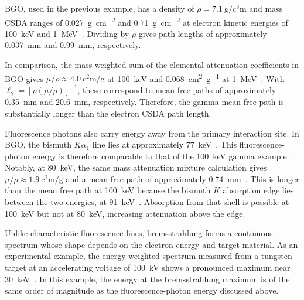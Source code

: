 BGO, used in the previous example, has a density of $\rho=\qty{7.1}{\gram\per\cubic\centi\metre}$ and mass CSDA ranges of \qty{0.027}{\gram\per\square\centi\metre} and \qty{0.71}{\gram\per\square\centi\metre} at electron kinetic energies of \qty{100}{\kilo\electronvolt} and \qty{1}{\mega\electronvolt}~\parencite{nistestar}. Dividing by $\rho$ gives path lengths of approximately \qty{0.037}{\milli\metre} and \qty{0.99}{\milli\metre}, respectively.

In comparison, the mass-weighted sum of the elemental attenuation coefficients in BGO gives $\mu/\rho\approx\qty{4.0}{\square\centi\metre\per\gram}$ at \qty{100}{\kilo\electronvolt} and \qty{0.068}{\square\centi\metre\per\gram} at \qty{1}{\mega\electronvolt}~\parencite{nistxcom}. With $\ell_\gamma=[\rho(\mu/\rho)]^{-1}$, these correspond to mean free paths of approximately \qty{0.35}{\milli\metre} and \qty{20.6}{\milli\metre}, respectively. Therefore, the gamma mean free path is substantially longer than the electron CSDA path length.

Fluorescence photons also carry energy away from the primary interaction site. In BGO, the bismuth $K\alpha_1$ line lies at approximately \qty{77}{\kilo\electronvolt}~\parencite[table 1-2]{kortright2009xray}. This fluorescence-photon energy is therefore comparable to that of the \qty{100}{\kilo\electronvolt} gamma example. Notably, at \qty{80}{\kilo\electronvolt}, the same mass attenuation mixture calculation gives $\mu/\rho\approx\qty{1.9}{\square\centi\metre\per\gram}$ and a mean free path of approximately \qty{0.74}{\milli\metre}~\parencite{nistestar,nistxcom}. This is longer than the mean free path at \qty{100}{\kilo\electronvolt} because the bismuth $K$ absorption edge lies between the two energies, at \qty{91}{\kilo\electronvolt}~\parencite{nistxcom}. Absorption from that shell is possible at \qty{100}{\kilo\electronvolt} but not at \qty{80}{\kilo\electronvolt}, increasing attenuation above the edge.

Unlike characteristic fluorescence lines, bremsstrahlung forms a continuous spectrum whose shape depends on the electron energy and target material. As an experimental example, the energy-weighted spectrum measured from a tungsten target at an accelerating voltage of \qty{100}{\kilo\volt} shows a pronounced maximum near \qty{30}{\kilo\electronvolt}~\parencite{ehrlich1955bremsstrahlung}. In this example, the energy at the bremsstrahlung maximum is of the same order of magnitude as the fluorescence-photon energy discussed above.

